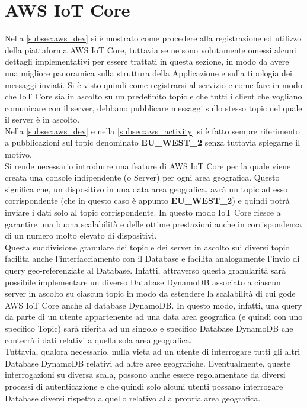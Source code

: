 \section{AWS IoT Core}
\label{sec:aws_core}
Nella \autoref{subsec:aws_dev} si è mostrato come procedere alla registrazione ed utilizzo della piattaforma AWS IoT Core, tuttavia se ne sono volutamente omessi alcuni dettagli implementativi per essere trattati in questa sezione, in modo da avere una migliore panoramica sulla struttura della Applicazione e sulla tipologia dei messaggi inviati.
Si è visto quindi come registrarsi al servizio e come fare in modo che IoT Core sia in ascolto su un predefinito topic e che tutti i client che vogliano comunicare con il server, debbano pubblicare messaggi sullo stesso topic nel quale il server è in ascolto.\\
Nella \autoref{subsec:aws_dev} e nella \autoref{subsec:aws_activity} si è fatto sempre riferimento a pubblicazioni sul topic denominato \textbf{EU\_WEST\_2} senza tuttavia spiegarne il motivo. \\
Si rende necessario introdurre una feature di AWS IoT Core per la quale viene creata una console indipendente (o Server) per ogni area geografica. Questo significa che, un dispositivo in una data area geografica, avrà un topic ad esso corrispondente (che in questo caso è appunto \textbf{EU\_WEST\_2}) e quindi potrà inviare i dati solo al topic corrispondente. In questo modo IoT Core riesce a garantire una buona scalabilità e delle ottime prestazioni anche in corrispondenza di un numero molto elevato di dispositivi. \\
Questa suddivisione granulare dei topic e dei server in ascolto sui diversi topic facilita anche l'interfacciamento con il Database e facilita analogamente l'invio di query geo-referenziate al Database.
Infatti, attraverso questa granularità sarà possibile implementare un diverso Database DynamoDB associato a ciascun server in ascolto su ciascun topic in modo da estendere la scalabilità di cui gode AWS IoT Core anche al database DynamoDB.
In questo modo, infatti, una query da parte di un utente appartenente ad una data area geografica (e quindi con uno specifico Topic) sarà riferita ad un singolo e specifico Database DynamoDB che conterrà i dati relativi a quella sola area geografica. \\
Tuttavia, qualora necessario, nulla vieta ad un utente di interrogare tutti gli altri Database DynamoDB relativi ad altre aree geografiche. Eventualmente, queste interrogazioni su diversa scala, possono anche essere regolamentate da diversi processi di autenticazione e che quindi solo alcuni utenti possano interrogare Database diversi rispetto a quello relativo alla propria area geografica.
